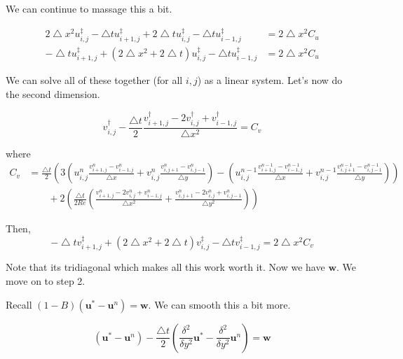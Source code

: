 \documentclass[12pt]{article}
\begin{document}
We can continue to massage this a bit.

\begin{align*}
    2\bigtriangleup x^2 u^\ddagger_{i,j} - \bigtriangleup t u^\ddagger_{i+1,j} + 2\bigtriangleup t u^\ddagger_{i,j} - \bigtriangleup t u^\ddagger_{i-1,j} &= 2\bigtriangleup x^2 C_u \\
    - \bigtriangleup tu^\ddagger_{i+1,j} + (2\bigtriangleup x^2 + 2\bigtriangleup t)u^\ddagger_{i,j} - \bigtriangleup t u^\ddagger_{i-1,j} &= 2\bigtriangleup x^2 C_u
\end{align*}

We can solve all of these together (for all $i,j$) as a linear system. Let's now do the second dimension.

\begin{equation}
    v^\dagger_{i,j} - \frac{\bigtriangleup t}{2} \frac{v^\dagger_{i+1,j} - 2v^\dagger_{i,j} + v^\dagger_{i-1,j}}{\bigtriangleup x^2} = C_v
\end{equation}

where
\begin{align*}
    C_v &= \frac{\bigtriangleup t}{2}(3(u^n_{i,j}\frac{v^n_{i+1,j} - v^n_{i-1,j}}{\bigtriangleup x} + v^n_{i,j}\frac{v^n_{i,j+1} - v^n_{i,j-1}}{\bigtriangleup y}) - (u^{n-1}_{i,j}\frac{v^{n-1}_{i+1,j} - v^{n-1}_{i-1,j}}{\bigtriangleup x} + v^{n-1}_{i,j}\frac{v^{n-1}_{i,j+1} - v^{n-1}_{i,j-1}}{\bigtriangleup y})) \\
    & \qquad + 2(\frac{\bigtriangleup t}{2 Re}(\frac{v^n_{i+1,j} -2v^n_{i,j} + v^n_{i-1,j}}{\bigtriangleup x^2} + \frac{v^n_{i,j+1} -2v^n_{i,j} + v^n_{i,j-1}}{\bigtriangleup y^2}))
\end{align*}

Then,
\begin{equation}
    - \bigtriangleup t v^\ddagger_{i+1,j} + (2\bigtriangleup x^2 + 2\bigtriangleup t)v^\ddagger_{i,j} - \bigtriangleup t v^\ddagger_{i-1,j} = 2\bigtriangleup x^2 C_v
\end{equation}

Note that its tridiagonal which makes all this work worth it. Now we have $\mathbf{w}$. We move on to step 2.

Recall $(1 - B)(\mathbf{u}^* - \mathbf{u}^n) = \mathbf{w}$. We can smooth this a bit more.

\begin{equation}
    (\mathbf{u}^* - \mathbf{u}^n) - \frac{\bigtriangleup t}{2}(\frac{\delta^2}{\delta y^2} \mathbf{u}^* - \frac{\delta^2}{\delta y^2} \mathbf{u}^n) = \mathbf{w}
\end{equation}
\end{document}
